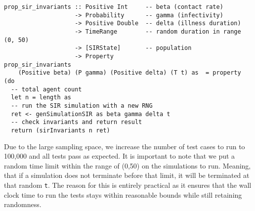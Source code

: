 \begin{footnotesize}
\begin{verbatim}
prop_sir_invariants :: Positive Int     -- beta (contact rate)
                    -> Probability      -- gamma (infectivity)
                    -> Positive Double  -- delta (illness duration)
                    -> TimeRange        -- random duration in range (0, 50)
                    -> [SIRState]       -- population
                    -> Property
prop_sir_invariants 
    (Positive beta) (P gamma) (Positive delta) (T t) as  = property (do
  -- total agent count
  let n = length as
  -- run the SIR simulation with a new RNG 
  ret <- genSimulationSIR as beta gamma delta t
  -- check invariants and return result
  return (sirInvariants n ret)
\end{verbatim}
\end{footnotesize}

Due to the large sampling space, we increase the number of test cases to run to 100,000 and all tests pass as expected. It is important to note that we put a random time limit within the range of (0,50) on the simulations to run. Meaning, that if a simulation does not terminate before that limit, it will be terminated at that random \texttt{t}. The reason for this is entirely practical as it ensures that the wall clock time to run the tests stays within reasonable bounds while still retaining randomness.